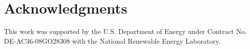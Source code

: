 \documentclass[]{aiaa-tc}%
\begin{document}
\section*{Acknowledgments}
This work was supported by the U.S. Department of Energy under Contract No. DE-AC36-08GO28308 with the National Renewable Energy Laboratory.



% 

\end{document}
